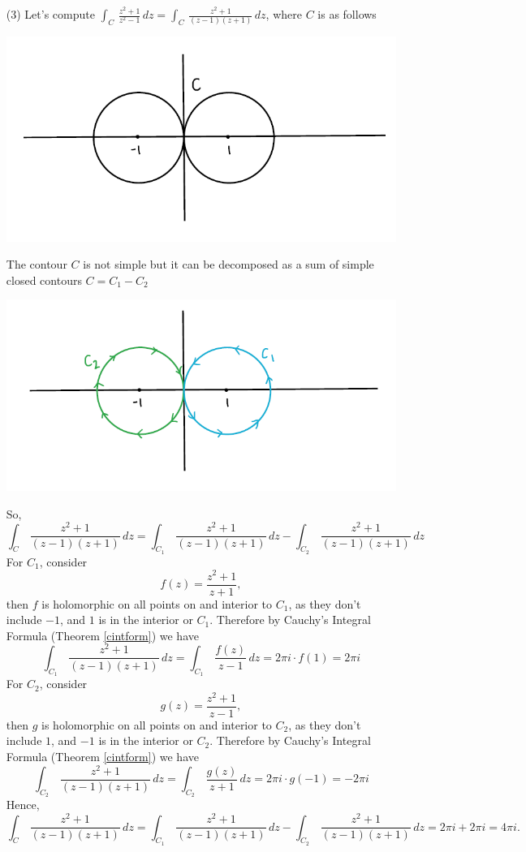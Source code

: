 \begin{example}
\begin{itemize}[itemsep=2em]
\item[(3)] Let's compute $\displaystyle \int_C\, \frac{z^2 + 1}{z^2 - 1}\, dz = \int_C\, \frac{z^2 + 1}{(z - 1)(z + 1)}\, dz$, where $C$ is as follows
\begin{center}
\includegraphics[scale=0.75]{Sections/Illustrations/Example-3.10.3-3-curve.png}
\end{center}
The contour $C$ is not simple but it can be decomposed as a sum of simple closed contours $C = C_1 - C_2$
\begin{center}
\includegraphics[scale=0.75]{Sections/Illustrations/Example-3.10.3-3-contour.png}
\end{center}
So, 
\[\int_C\, \frac{z^2 + 1}{(z - 1)(z + 1)}\,dz = \int_{C_1}\, \frac{z^2 + 1}{(z - 1)(z + 1)}\,dz - \int_{C_2}\, \frac{z^2 + 1}{(z - 1)(z + 1)}\,dz\]
For $C_1$, consider
\[f(z) = \frac{z^2 + 1}{z + 1},\]
then $f$ is holomorphic on all points on and interior to $C_1$, as they don't include $-1$, and $1$ is in the interior or $C_1$. Therefore by Cauchy's Integral Formula (Theorem \ref{cintform}) we have
\[\int_{C_1}\, \frac{z^2 + 1}{(z - 1)(z + 1)}\,dz = \int_{C_1}\, \frac{f(z)}{z - 1}\,dz = 2\pi i\cdot f(1) = 2\pi i\]
For $C_2$, consider
\[g(z) = \frac{z^2 + 1}{z - 1},\]
then $g$ is holomorphic on all points on and interior to $C_2$, as they don't include $1$, and $-1$ is in the interior or $C_2$. Therefore by Cauchy's Integral Formula (Theorem \ref{cintform}) we have
\[\int_{C_2}\, \frac{z^2 + 1}{(z - 1)(z + 1)}\,dz = \int_{C_2}\, \frac{g(z)}{z + 1}\,dz = 2\pi i\cdot g(-1) = -2\pi i\]
Hence, 
\[\int_C\, \frac{z^2 + 1}{(z - 1)(z + 1)}\,dz = \int_{C_1}\, \frac{z^2 + 1}{(z - 1)(z + 1)}\,dz - \int_{C_2}\, \frac{z^2 + 1}{(z - 1)(z + 1)}\,dz = 2\pi i + 2\pi i = 4\pi i.\]
\end{itemize}
\end{example}

